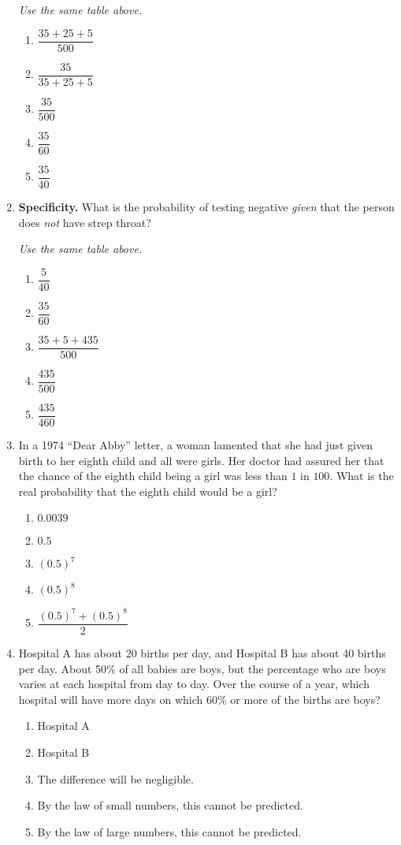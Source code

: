 \documentclass{article}
\newcommand{\uses}[1]{}         %
\begin{document}
\begin{enumerate}[label=\textbf{S\arabic*.}]
\textit{Use the same table above.}

\begin{enumerate}
  \item $\dfrac{35+25+5}{500}$
  \item $\dfrac{35}{35+25+5}$
  \item $\dfrac{35}{500}$
  \item $\dfrac{35}{60}$
  \item $\dfrac{35}{40}$
\end{enumerate}

\item \uses{strep-2x2} \textbf{Specificity.} What is the probability of testing negative
\emph{given} that the person does \emph{not} have strep throat? 

\textit{Use the same table above.}

\begin{enumerate}
  \item $\dfrac{5}{40}$
  \item $\dfrac{35}{60}$
  \item $\dfrac{35+5+435}{500}$
  \item $\dfrac{435}{500}$
  \item $\dfrac{435}{460}$
\end{enumerate}

\item In a 1974 ``Dear Abby'' letter, a woman lamented that she had just given
birth to her eighth child and all were girls. Her doctor had assured her that
the chance of the eighth child being a girl was less than $1$ in $100$.
What is the real probability that the eighth child would be a girl?
\begin{enumerate}
  \item $0.0039$
  \item $0.5$
  \item $(0.5)^{7}$
  \item $(0.5)^{8}$
  \item $\dfrac{(0.5)^{7}+(0.5)^{8}}{2}$
\end{enumerate}

\item Hospital A has about 20 births per day, and Hospital B has about 40 births
per day. About 50\% of all babies are boys, but the percentage who are boys
varies at each hospital from day to day. Over the course of a year, which
hospital will have more days on which 60\% or more of the births are boys?
\begin{enumerate}
  \item Hospital A
  \item Hospital B
  \item The difference will be negligible.
  \item By the law of small numbers, this cannot be predicted.
  \item By the law of large numbers, this cannot be predicted.
\end{enumerate}


\end{enumerate}
\end{document}
